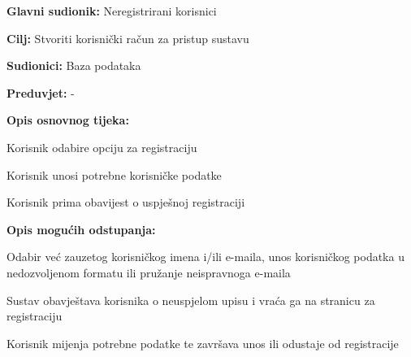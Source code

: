 			
			\noindent {}
			\begin{packed_item}
				
				\item \textbf{Glavni sudionik:} Neregistrirani korisnici
				\item  \textbf{Cilj:} Stvoriti korisnički račun za pristup sustavu
				\item  \textbf{Sudionici:} Baza podataka
				\item  \textbf{Preduvjet:} -
				\item  \textbf{Opis osnovnog tijeka:}
				
				\item[] \begin{packed_enum}
					
					\item Korisnik odabire opciju za registraciju
					\item Korisnik unosi potrebne korisničke podatke 
					\item Korisnik prima obavijest o uspješnoj registraciji
					
				\end{packed_enum}
				
				\item  \textbf{Opis mogućih odstupanja:}
				
				\item[] \begin{packed_item}
					
					\item[3.a] Odabir već zauzetog korisničkog imena i/ili e-maila, unos korisničkog podatka u nedozvoljenom formatu ili pružanje neispravnoga e-maila 
					\item[] \begin{packed_enum}
						
						\item Sustav obavještava korisnika o neuspjelom upisu i vraća ga na stranicu za registraciju
						\item Korisnik mijenja potrebne podatke te završava unos ili odustaje od registracije
					\end{packed_enum}
					
				\end{packed_item}
			\end{packed_item}
			
